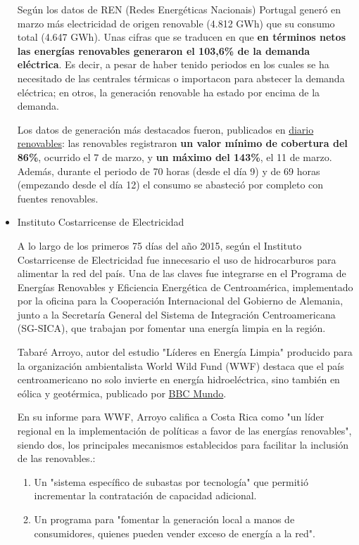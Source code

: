 \begin{itemize}
  Según los datos de REN (Redes Energéticas Nacionais) Portugal generó
  en marzo más electricidad de origen renovable (4.812 GWh) que su
  consumo total (4.647 GWh). Unas cifras que se traducen en que
  \textbf{en términos netos las energías renovables generaron el 103,6\%
  de la demanda eléctrica}. Es decir, a pesar de haber tenido periodos
  en los cuales se ha necesitado de las centrales térmicas o importacon
  para abstecer la demanda eléctrica; en otros, la generación renovable
  ha estado por encima de la demanda.

  Los datos de generación más destacados fueron, publicados en
  \href{https://www.diariorenovables.com/2018/04/portugal-genero-100-electricidad-energias-renovables.html}{diario
  renovables}: las renovables registraron \textbf{un valor mínimo de
  cobertura del 86\%}, ocurrido el 7 de marzo, y \textbf{un máximo del
  143\%}, el 11 de marzo. Además, durante el periodo de 70 horas (desde
  el día 9) y de 69 horas (empezando desde el día 12) el consumo se
  abasteció por completo con fuentes renovables.
\item
  Instituto Costarricense de Electricidad

  A lo largo de los primeros 75 días del año 2015, según el Instituto
  Costarricense de Electricidad fue innecesario el uso de hidrocarburos
  para alimentar la red del país. Una de las claves fue integrarse en el
  Programa de Energías Renovables y Eficiencia Energética de
  Centroamérica, implementado por la oficina para la Cooperación
  Internacional del Gobierno de Alemania, junto a la Secretaría General
  del Sistema de Integración Centroamericana (SG-SICA), que trabajan por
  fomentar una energía limpia en la región.

  Tabaré Arroyo, autor del estudio "Líderes en Energía Limpia" producido
  para la organización ambientalista World Wild Fund (WWF) destaca que
  el país centroamericano no solo invierte en energía hidroeléctrica,
  sino también en eólica y geotérmica, publicado por
  \href{http://www.bbc.com/mundo/noticias/2015/03/150323_costa_rica_energia_renovable_az_ep}{BBC
  Mundo}.

  En su informe para WWF, Arroyo califica a Costa Rica como "un líder
  regional en la implementación de políticas a favor de las energías
  renovables", siendo dos, los principales mecanismos establecidos para
  facilitar la inclusión de las renovables.:

  \begin{enumerate}
  \def\labelenumi{\arabic{enumi}.}
  \item
    Un "sistema específico de subastas por tecnología" que permitió
    incrementar la contratación de capacidad adicional.
  \item
    Un programa para "fomentar la generación local a manos de
    consumidores, quienes pueden vender exceso de energía a la red".
  \end{enumerate}


\end{itemize}
